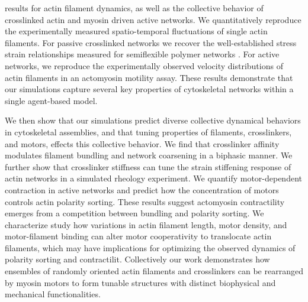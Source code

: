 \documentclass[12pt]{article}
\begin{document}
results for actin filament dynamics, as well as the collective behavior of 
crosslinked actin and myosin driven active networks. 
We quantitatively reproduce the experimentally measured spatio-temporal 
fluctuations of single actin filaments. 
For passive crosslinked networks we recover the well-established stress strain 
relationships measured for semiflexible polymer networks \cite{gardel2004,koenderink2006,kasza2009,lin2010}. 
For active networks, we reproduce the experimentally observed velocity 
distributions of actin filaments in an actomyosin motility assay. These results 
demonstrate that our simulations capture several key properties of cytoskeletal 
networks within a single agent-based model.
\par 
We then show that our simulations predict diverse collective dynamical behaviors
in cytoskeletal assemblies, and that tuning properties of filaments, 
crosslinkers, and motors, effects this collective behavior. 
We find that crosslinker affinity modulates filament bundling and network 
coarsening in a biphasic manner. We further show that crosslinker 
stiffness can tune the strain stiffening response of actin networks in a 
simulated rheology experiment. We quantify motor-dependent contraction in active
networks and predict how the concentration of motors controls actin polarity 
sorting. These results suggest actomyosin contractility emerges from a 
competition between bundling and polarity sorting. We characterize study how 
variations in actin filament length, motor density, and motor-filament binding 
can alter motor cooperativity to translocate actin filaments, which may have
implications for optimizing the observed dynamics of polarity sorting and 
contractilit. Collectively our work demonstrates how ensembles of randomly
oriented actin filaments and crosslinkers can be rearranged by myosin motors to 
form tunable structures with distinct biophysical and mechanical functionalities. 
\end{document}
